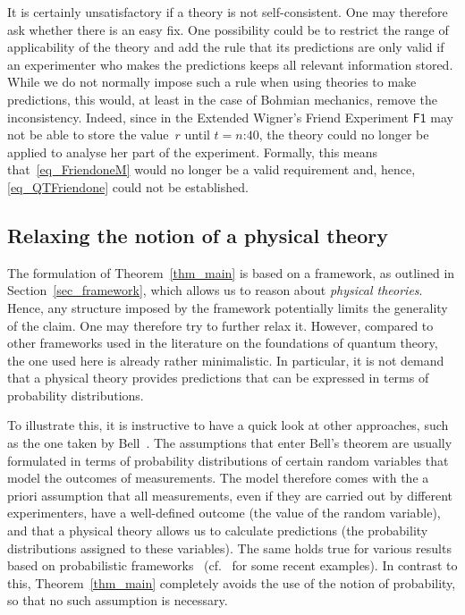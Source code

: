 \documentclass[12pt]{article}
\theoremstyle{plain}
\theoremstyle{definition}
\newcommand*{\Friendone}{\mathsf{F1}}
\begin{document}
It is certainly unsatisfactory if a theory is not self-consistent. One may therefore ask whether there is an easy fix. One  possibility could be to restrict the range of applicability of the theory and add the rule that its predictions are only valid if an experimenter who makes the predictions keeps all relevant information stored.  While we do not normally impose such a rule when using theories to make predictions, this would, at least in the case of Bohmian mechanics, remove the inconsistency. Indeed, since in the Extended Wigner's Friend Experiment $\Friendone$ may not be able to store the value~$r$ until $t=\text{$n$:40}$, the theory could no longer be applied to analyse her part of the experiment. Formally, this means that~\eqref{eq_FriendoneM} would no longer be a valid requirement and, hence, \eqref{eq_QTFriendone} could not be established. 



\subsection{Relaxing the notion of a physical theory} \label{sec_theories}

The formulation of Theorem~\ref{thm_main} is based on a  framework, as outlined in Section~\ref{sec_framework}, which allows us to reason about \emph{physical theories}. Hence, any structure imposed by the framework potentially limits the generality of the claim. One may therefore try to further relax it. However, compared to other frameworks used in the literature on the foundations of quantum theory, the one used here is already rather minimalistic. In particular, it is not demand that a physical theory provides predictions that can be expressed in terms of probability distributions. 

To illustrate this, it is instructive to have a quick look at other approaches, such as the one taken by Bell~\cite{Bell66}. The assumptions that enter Bell's theorem are usually formulated in terms of probability distributions of certain random variables that model the outcomes of measurements.  The model therefore comes with the a priori assumption that all measurements, even if they are carried out by different experimenters, have a well-defined outcome (the value of the random variable), and that a physical theory allows us to calculate predictions (the probability distributions assigned to these variables). The same holds true for various results based on probabilistic frameworks~\cite{Barrett07,BarWil16} (cf.\ \cite{Hardy11,ChDaPe11,MasMul11,ColRen12,PuBaRu12,OrCoBr12,LeiSpe13} for some recent examples). In contrast to this, Theorem~\ref{thm_main} completely avoids the use of the notion of probability, so that no such assumption is necessary. 
\end{document}
